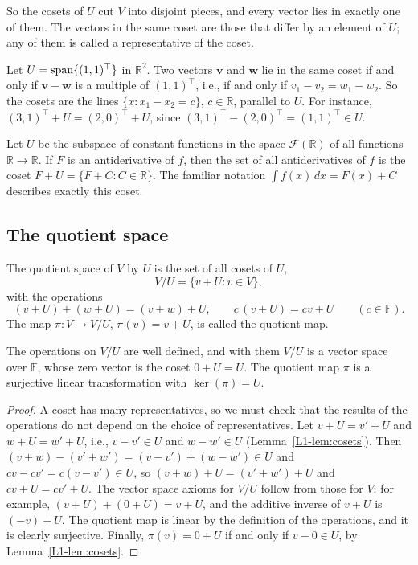 So the cosets of $U$ cut $V$ into disjoint pieces, and every vector lies in exactly one of them. The vectors in the same coset are those that differ by an element of $U$; any of them is called a representative of the coset.

\begin{example}\label{L1-ex:cosets-line}
    Let $U = \operatorname{span}\{(1, 1)^\top\}$ in $\mathbb{R}^2$. Two vectors $\mathbf{v}$ and $\mathbf{w}$ lie in the same coset if and only if $\mathbf{v} - \mathbf{w}$ is a multiple of $(1, 1)^\top$, i.e., if and only if $v_1 - v_2 = w_1 - w_2$. So the cosets are the lines $\{x : x_1 - x_2 = c\}$, $c \in \mathbb{R}$, parallel to $U$. For instance, $(3, 1)^\top + U = (2, 0)^\top + U$, since $(3, 1)^\top - (2, 0)^\top = (1, 1)^\top \in U$.
\end{example}

\begin{example}
    Let $U$ be the subspace of constant functions in the space $\mathcal{F}(\mathbb{R})$ of all functions $\mathbb{R} \to \mathbb{R}$. If $F$ is an antiderivative of $f$, then the set of all antiderivatives of $f$ is the coset $F + U = \{F + C : C \in \mathbb{R}\}$. The familiar notation $\int f(x)\, dx = F(x) + C$ describes exactly this coset.
\end{example}

\subsection{The quotient space}

\begin{definition}
    The quotient space of $V$ by $U$ is the set of all cosets of $U$,
    \[V/U = \{v + U : v \in V\},\]
    with the operations
    \[(v + U) + (w + U) = (v + w) + U, \qquad c\,(v + U) = cv + U \qquad (c \in \mathbb{F}).\]
    The map $\pi: V \to V/U$, $\pi(v) = v + U$, is called the quotient map.
\end{definition}

\begin{proposition}\label{L1-prop:quotient}
    The operations on $V/U$ are well defined, and with them $V/U$ is a vector space over $\mathbb{F}$, whose zero vector is the coset $0 + U = U$. The quotient map $\pi$ is a surjective linear transformation with $\ker(\pi) = U$.
\end{proposition}

\begin{proof}
    A coset has many representatives, so we must check that the results of the operations do not depend on the choice of representatives. Let $v + U = v' + U$ and $w + U = w' + U$, i.e., $v - v' \in U$ and $w - w' \in U$ (Lemma~\ref{L1-lem:cosets}). Then $(v + w) - (v' + w') = (v - v') + (w - w') \in U$ and $cv - cv' = c(v - v') \in U$, so $(v + w) + U = (v' + w') + U$ and $cv + U = cv' + U$. The vector space axioms for $V/U$ follow from those for $V$; for example, $(v + U) + (0 + U) = v + U$, and the additive inverse of $v + U$ is $(-v) + U$. The quotient map is linear by the definition of the operations, and it is clearly surjective. Finally, $\pi(v) = 0 + U$ if and only if $v - 0 \in U$, by Lemma~\ref{L1-lem:cosets}.
\end{proof}

